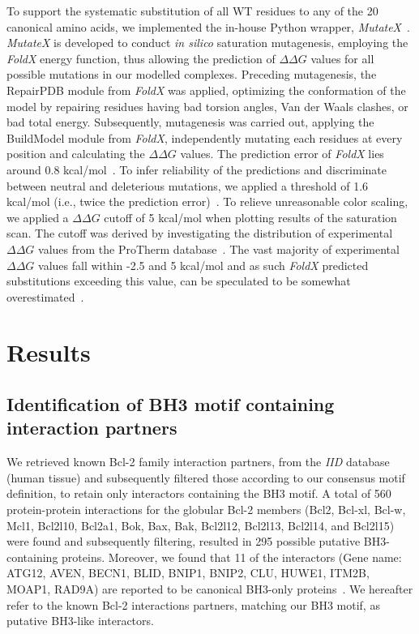 \documentclass[10pt,letterpaper]{article}
\begin{document}
To support the systematic substitution of all WT residues to any of the 20 canonical amino acids, we implemented the in-house Python wrapper, \textit{MutateX}~\cite{Tiberti}. \textit{MutateX} is developed to conduct \textit{in silico} saturation mutagenesis, employing the \textit{FoldX} energy function, thus allowing the prediction of $\Delta\Delta G$ values for all possible mutations in our modelled complexes.
Preceding mutagenesis, the RepairPDB module from \textit{FoldX} was applied, optimizing the conformation of the model by repairing residues having bad torsion angles, Van der Waals clashes, or bad total energy. Subsequently, mutagenesis was carried out, applying the BuildModel module from \textit{FoldX}, independently mutating each residues at every position and calculating the $\Delta\Delta G$ values.
The prediction error of \textit{FoldX} lies around 0.8 kcal/mol~\cite{Guerois2002}. To infer reliability of the predictions and discriminate between neutral and deleterious mutations, we applied a threshold of 1.6 kcal/mol (i.e., twice the prediction error)~\cite{Nygaard2016}. 
To relieve unreasonable color scaling, we applied a $\Delta\Delta G$ cutoff of 5 kcal/mol when plotting results of the saturation scan. The cutoff was derived by investigating the distribution of experimental $\Delta\Delta G$ values from the ProTherm database~\cite{Gromiha2002}. The vast majority of experimental $\Delta\Delta G$ values fall within -2.5 and 5 kcal/mol and as such \textit{FoldX} predicted substitutions exceeding this value, can be speculated to be somewhat overestimated~\cite{Tiberti}.

\section*{Results}

\subsection*{Identification of BH3 motif containing interaction partners}
We retrieved known Bcl-2 family interaction partners, from the \textit{IID} database (human tissue) and subsequently filtered those according to our consensus motif definition, to retain only interactors containing the BH3 motif.
A total of 560 protein-protein interactions for the globular Bcl-2 members (Bcl2, Bcl-xl, Bcl-w, Mcl1, Bcl2l10, Bcl2a1, Bok, Bax, Bak, Bcl2l12, Bcl2l13, Bcl2l14, and Bcl2l15) were found and subsequently filtering, resulted in 295 possible putative BH3-containing proteins. 
Moreover, we found that 11 of the interactors (Gene name: ATG12,  AVEN, BECN1, BLID, BNIP1, BNIP2, CLU, HUWE1, ITM2B, MOAP1, RAD9A) are reported to be canonical BH3-only proteins~\cite{Aouacheria2015}.
We hereafter refer to the known Bcl-2 interactions partners, matching our BH3 motif, as putative BH3-like interactors.
\end{document}

